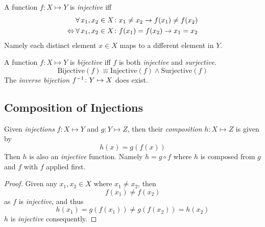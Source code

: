 \begin{definition}
    A function $f \colon X \mapsto Y$ is \textit{injective} iff
    \begin{align}
        &\operatorname{\forall} x_1, x_2 \in X \colon x_1 \neq x_2 \to f(x_1) \neq f(x_2) \\
        \Leftrightarrow &\operatorname{\forall} x_1, x_2 \in X \colon f(x_1) = f(x_2) \to x_1 = x_2
    \end{align}
    Namely each distinct element $x \in X$ maps to a different element in $Y$.
\end{definition}

\begin{definition}[Bijection]
    A function $f \colon X \mapsto Y$ is \textit{bijective} iff $f$ is both \textit{injective} and \textit{surjective}.
    \begin{equation}
        \mathrm{Bijective}(f) \equiv \mathrm{Injective}(f) \land \mathrm{Surjective}(f)
    \end{equation}
    The \textit{inverse bijection} ${f}^{-1} \colon Y \mapsto X$ does exist.
\end{definition}

\subsection{Composition of Injections}
\begin{proposition}
    Given \textit{injections} $f \colon X \mapsto Y$ and $g \colon Y \mapsto Z$, then their \textit{composition} $h \colon X \mapsto Z$ is given by
    \begin{equation}
        h(x) = g(f(x))
    \end{equation}
    Then $h$ is also an \textit{injective} function. Namely $h = g \circ f$ where $h$ is composed from $g$ and $f$ with $f$ applied first.
\end{proposition}

\begin{proof}
    Given any $x_1, x_2 \in X$ where $x_1 \neq x_2$, then
    \begin{equation}
        f(x_1) \ne f(x_2)
    \end{equation}
    as $f$ is \textit{injective}, and thus
    \begin{equation}
        h(x_1) = g(f(x_1)) \neq g(f(x_2)) = h(x_2)
    \end{equation}
    $h$ is \textit{injective} consequently.
\end{proof}

